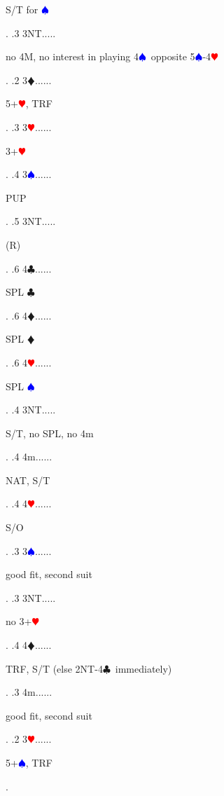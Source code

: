 \documentclass[a4paper]{article}
\newcommand{\BC}{\textcolor{OliveGreen}{$\clubsuit$}}
\newcommand{\BD}{\textcolor{RedOrange}{$\vardiamondsuit$}}
\newcommand{\BH}{\textcolor{Red}{$\varheartsuit${}}}
\newcommand{\BS}{\textcolor{Blue}{$\spadesuit${}}}
\begin{document}
{\begin{minipage}[t]{0.8\textwidth}
S/T for \BS 
\end{minipage}. 
 .3 3NT.....\begin{minipage}[t]{0.8\textwidth}
no 4M, no interest in playing 4\BS\ opposite 5\BS -4\BH 
\end{minipage}. 
 .2 3\BD......\begin{minipage}[t]{0.8\textwidth}
5+\BH , TRF
\end{minipage}. 
 .3 3\BH......\begin{minipage}[t]{0.8\textwidth}
3+\BH 
\end{minipage}. 
 .4 3\BS......\begin{minipage}[t]{0.8\textwidth}
PUP
\end{minipage}. 
 .5 3NT.....\begin{minipage}[t]{0.8\textwidth}
(R)
\end{minipage}. 
 .6 4\BC......\begin{minipage}[t]{0.8\textwidth}
SPL \BC 
\end{minipage}. 
 .6 4\BD......\begin{minipage}[t]{0.8\textwidth}
SPL \BD 
\end{minipage}. 
 .6 4\BH......\begin{minipage}[t]{0.8\textwidth}
SPL \BS 
\end{minipage}. 
 .4 3NT.....\begin{minipage}[t]{0.8\textwidth}
S/T, no SPL, no 4m
\end{minipage}. 
 .4 4m......\begin{minipage}[t]{0.8\textwidth}
NAT, S/T
\end{minipage}. 
 .4 4\BH......\begin{minipage}[t]{0.8\textwidth}
S/O
\end{minipage}. 
 .3 3\BS......\begin{minipage}[t]{0.8\textwidth}
good fit, second suit
\end{minipage}. 
 .3 3NT.....\begin{minipage}[t]{0.8\textwidth}
no 3+\BH 
\end{minipage}. 
 .4 4\BD......\begin{minipage}[t]{0.8\textwidth}
TRF, S/T (else 2NT-4\BC\ immediately)
\end{minipage}. 
 .3 4m......\begin{minipage}[t]{0.8\textwidth}
good fit, second suit
\end{minipage}. 
 .2 3\BH......\begin{minipage}[t]{0.8\textwidth}
5+\BS , TRF
\end{minipage}. 
}
\end{document}
